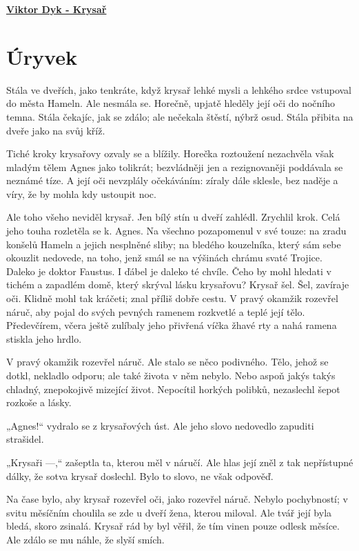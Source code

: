 \documentclass[11pt]{article}
\begin{document}
    \begin{center}
        \underline{\textbf{\Huge Viktor Dyk - Krysař}}
    \end{center}
    \section*{Úryvek}
    Stála ve dveřích, jako tenkráte, když krysař lehké mysli a lehkého srdce vstupoval do města Hameln. Ale nesmála se. Horečně, upjatě hleděly její oči do nočního temna. Stála čekajíc, jak se zdálo; ale nečekala štěstí, nýbrž osud. Stála přibita na dveře jako na svůj kříž.

    Tiché kroky krysařovy ozvaly se a blížily. Horečka roztoužení nezachvěla však mladým tělem Agnes jako tolikrát; bezvládněji jen a rezignovaněji poddávala se neznámé tíze. A její oči nevzplály očekáváním: zíraly dále sklesle, bez naděje a víry, že by mohla kdy ustoupit noc.

    Ale toho všeho neviděl krysař. Jen bílý stín u dveří zahlédl. Zrychlil krok. Celá jeho touha rozletěla se k. Agnes. Na všechno pozapomenul v své touze: na zradu konšelů Hameln a jejich nesplněné sliby; na bledého kouzelníka, který sám sebe okouzlit nedovede, na toho, jenž smál se na výšinách chrámu svaté Trojice. Daleko je doktor Faustus. I ďábel je daleko té chvíle. Čeho by mohl hledati v tichém a zapadlém domě, který skrýval lásku krysařovu? Krysař šel. Šel, zavíraje oči. Klidně mohl tak kráčeti; znal příliš dobře cestu. V pravý okamžik rozevřel náruč, aby pojal do svých pevných ramenem rozkvetlé a teplé její tělo. Předevčírem, včera ještě zulíbaly jeho přivřená víčka žhavé rty a nahá ramena stiskla jeho hrdlo.

    V pravý okamžik rozevřel náruč. Ale stalo se něco podivného. Tělo, jehož se dotkl, nekladlo odporu; ale také života v něm nebylo. Nebo aspoň jakýs takýs chladný, znepokojivě mizející život. Nepocítil horkých polibků, nezaslechl šepot rozkoše a lásky.

    „Agnes!“ vydralo se z krysařových úst. Ale jeho slovo nedovedlo zapuditi strašidel.

    „Krysaři —,“ zašeptla ta, kterou měl v náručí. Ale hlas její zněl z tak nepřístupné dálky, že sotva krysař doslechl. Bylo to slovo, ne však odpověď.

    Na čase bylo, aby krysař rozevřel oči, jako rozevřel náruč. Nebylo pochybností; v svitu měsíčním choulila se zde u dveří žena, kterou miloval. Ale tvář její byla bledá, skoro zsinalá. Krysař rád by byl věřil, že tím vinen pouze odlesk měsíce. Ale zdálo se mu náhle, že slyší smích.
\end{document}
